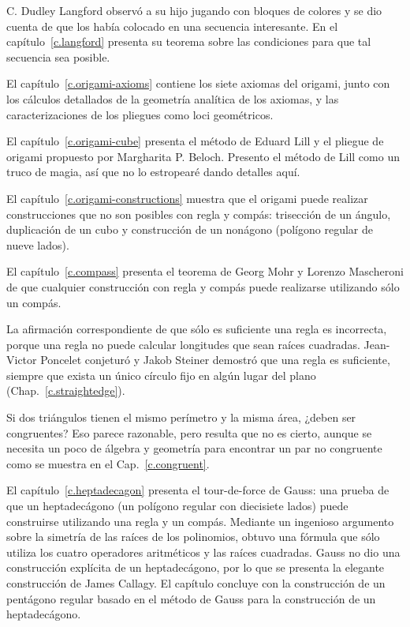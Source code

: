 C. Dudley Langford observó a su hijo jugando con bloques de colores y se dio cuenta de que los había colocado en una secuencia interesante. En el capítulo~\ref{c.langford} presenta su teorema sobre las condiciones para que tal secuencia sea posible.

El capítulo~\ref{c.origami-axioms} contiene los siete axiomas del origami, junto con los cálculos detallados de la geometría analítica de los axiomas, y las caracterizaciones de los pliegues como loci geométricos.

El capítulo~\ref{c.origami-cube} presenta el método de Eduard Lill y el pliegue de origami propuesto por Margharita P. Beloch. Presento el método de Lill como un truco de magia, así que no lo estropearé dando detalles aquí.

El capítulo~\ref{c.origami-constructions} muestra que el origami puede realizar construcciones que no son posibles con regla y compás: trisección de un ángulo, duplicación de un cubo y construcción de un nonágono (polígono regular de nueve lados).

El capítulo~\ref{c.compass} presenta el teorema de Georg Mohr y Lorenzo Mascheroni de que cualquier construcción con regla y compás puede realizarse utilizando sólo un compás.

La afirmación correspondiente de que sólo es suficiente una regla es incorrecta, porque una regla no puede calcular longitudes que sean raíces cuadradas. Jean-Victor Poncelet conjeturó y Jakob Steiner demostró que una regla es suficiente, siempre que exista un único círculo fijo en algún lugar del plano (Chap.~\ref{c.straightedge}).

Si dos triángulos tienen el mismo perímetro y la misma área, ¿deben ser congruentes? Eso parece razonable, pero resulta que no es cierto, aunque se necesita un poco de álgebra y geometría para encontrar un par no congruente como se muestra en el Cap.~\ref{c.congruent}.

El capítulo~\ref{c.heptadecagon} presenta el tour-de-force de Gauss: una prueba de que un heptadecágono (un polígono regular con diecisiete lados) puede construirse utilizando una regla y un compás. Mediante un ingenioso argumento sobre la simetría de las raíces de los polinomios, obtuvo una fórmula que sólo utiliza los cuatro operadores aritméticos y las raíces cuadradas. Gauss no dio una construcción explícita de un heptadecágono, por lo que se presenta la elegante construcción de James Callagy. El capítulo concluye con la construcción de un pentágono regular basado en el método de Gauss para la construcción de un heptadecágono.

